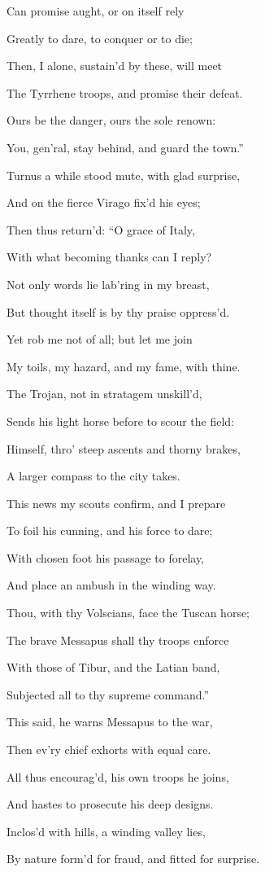 Can promise aught, or on itself rely

Greatly to dare, to conquer or to die;

Then, I alone, sustain’d by these, will meet

The Tyrrhene troops, and promise their defeat.

Ours be the danger, ours the sole renown:

You, gen’ral, stay behind, and guard the town.”

Turnus a while stood mute, with glad surprise,

And on the fierce Virago fix’d his eyes;

Then thus return’d: “O grace of Italy,

With what becoming thanks can I reply?

Not only words lie lab’ring in my breast,

But thought itself is by thy praise oppress’d.

Yet rob me not of all; but let me join

My toils, my hazard, and my fame, with thine.

The Trojan, not in stratagem unskill’d,

Sends his light horse before to scour the field:

Himself, thro’ steep ascents and thorny brakes,

A larger compass to the city takes.

This news my scouts confirm, and I prepare

To foil his cunning, and his force to dare;

With chosen foot his passage to forelay,

And place an ambush in the winding way.

Thou, with thy Volscians, face the Tuscan horse;

The brave Messapus shall thy troops enforce

With those of Tibur, and the Latian band,

Subjected all to thy supreme command.”

This said, he warns Messapus to the war,

Then ev’ry chief exhorts with equal care.

All thus encourag’d, his own troops he joins,

And hastes to prosecute his deep designs.

Inclos’d with hills, a winding valley lies,

By nature form’d for fraud, and fitted for surprise.

